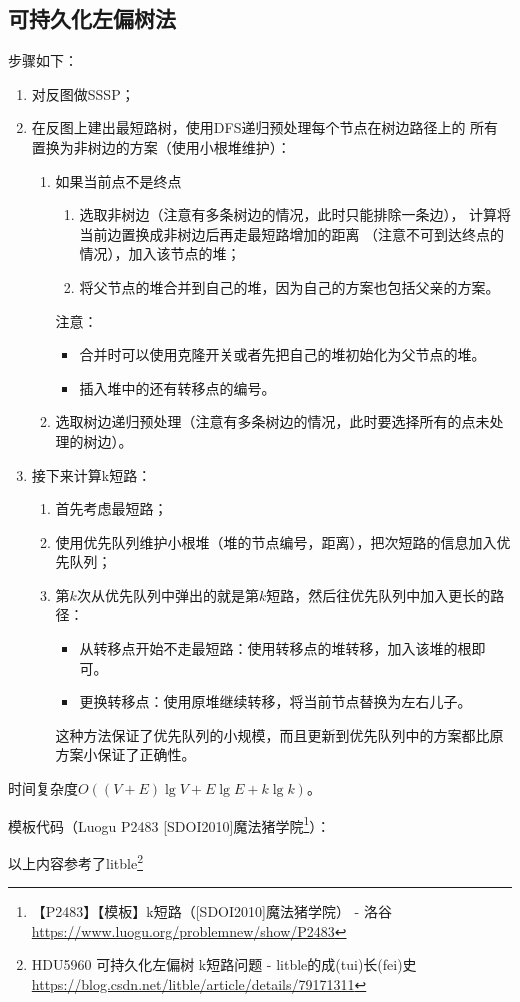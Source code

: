 \subsection{可持久化左偏树法}
步骤如下：
\begin{enumerate}
    \item 对反图做SSSP；
    \item 在反图上建出最短路树，使用DFS递归预处理每个节点在树边路径上的
    所有置换为非树边的方案（使用小根堆维护）：
    \begin{enumerate}
        \item 如果当前点不是终点
        \begin{enumerate}
            \item 选取非树边（注意有多条树边的情况，此时只能排除一条边），
            计算将当前边置换成非树边后再走最短路增加的距离
            （注意不可到达终点的情况），加入该节点的堆；
            \item 将父节点的堆合并到自己的堆，因为自己的方案也包括父亲的方案。
        \end{enumerate}
        注意：
        \begin{itemize}
            \item 合并时可以使用克隆开关或者先把自己的堆初始化为父节点的堆。
            \item 插入堆中的还有转移点的编号。
        \end{itemize}

        \item 选取树边递归预处理（注意有多条树边的情况，此时要选择所有的点未处
        理的树边）。
    \end{enumerate}
    \item 接下来计算k短路：
    \begin{enumerate}
        \item 首先考虑最短路；
        \item 使用优先队列维护小根堆（堆的节点编号，距离），把次短路的信息加入优先队列；
        \item 第$k$次从优先队列中弹出的就是第$k$短路，然后往优先队列中加入更长的路径：
        \begin{itemize}
            \item 从转移点开始不走最短路：使用转移点的堆转移，加入该堆的根即可。
            \item 更换转移点：使用原堆继续转移，将当前节点替换为左右儿子。
        \end{itemize}
        这种方法保证了优先队列的小规模，而且更新到优先队列中的方案都比原方案小保证了正确性。
    \end{enumerate}
\end{enumerate}

时间复杂度$O((V+E)\lg V+E \lg E+k \lg k)$。

模板代码（Luogu P2483 [SDOI2010]魔法猪学院\footnote{
【P2483】【模板】k短路（[SDOI2010]魔法猪学院） - 洛谷
\url{https://www.luogu.org/problemnew/show/P2483}
}）：



以上内容参考了litble\footnote{HDU5960 可持久化左偏树 k短路问题 - litble的成(tui)长(fei)史
	\url{https://blog.csdn.net/litble/article/details/79171311}
}
